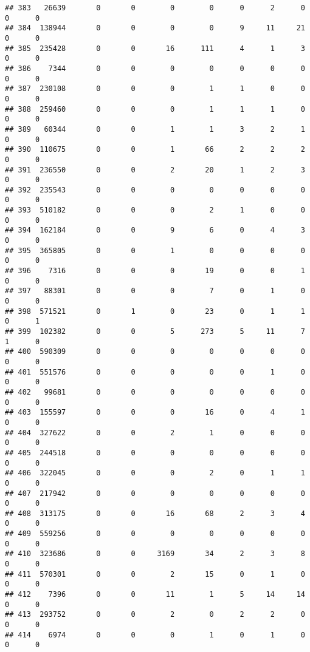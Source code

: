 \documentclass[
]{article}
\begin{document}
\begin{verbatim}
## 383   26639       0       0        0        0      0      2      0     0      0
## 384  138944       0       0        0        0      9     11     21     0      0
## 385  235428       0       0       16      111      4      1      3     0      0
## 386    7344       0       0        0        0      0      0      0     0      0
## 387  230108       0       0        0        1      1      0      0     0      0
## 388  259460       0       0        0        1      1      1      0     0      0
## 389   60344       0       0        1        1      3      2      1     0      0
## 390  110675       0       0        1       66      2      2      2     0      0
## 391  236550       0       0        2       20      1      2      3     0      0
## 392  235543       0       0        0        0      0      0      0     0      0
## 393  510182       0       0        0        2      1      0      0     0      0
## 394  162184       0       0        9        6      0      4      3     0      0
## 395  365805       0       0        1        0      0      0      0     0      0
## 396    7316       0       0        0       19      0      0      1     0      0
## 397   88301       0       0        0        7      0      1      0     0      0
## 398  571521       0       1        0       23      0      1      1     0      1
## 399  102382       0       0        5      273      5     11      7     1      0
## 400  590309       0       0        0        0      0      0      0     0      0
## 401  551576       0       0        0        0      0      1      0     0      0
## 402   99681       0       0        0        0      0      0      0     0      0
## 403  155597       0       0        0       16      0      4      1     0      0
## 404  327622       0       0        2        1      0      0      0     0      0
## 405  244518       0       0        0        0      0      0      0     0      0
## 406  322045       0       0        0        2      0      1      1     0      0
## 407  217942       0       0        0        0      0      0      0     0      0
## 408  313175       0       0       16       68      2      3      4     0      0
## 409  559256       0       0        0        0      0      0      0     0      0
## 410  323686       0       0     3169       34      2      3      8     0      0
## 411  570301       0       0        2       15      0      1      0     0      0
## 412    7396       0       0       11        1      5     14     14     0      0
## 413  293752       0       0        2        0      2      2      0     0      0
## 414    6974       0       0        0        1      0      1      0     0      0

\end{verbatim}
\end{document}
